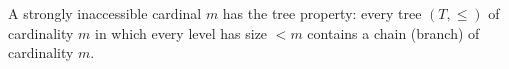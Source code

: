A strongly inaccessible cardinal $m$ has the tree property: every tree $(T, \leq)$ of cardinality $m$ in which every level has size $< m$ contains a chain (branch) of cardinality $m$.
